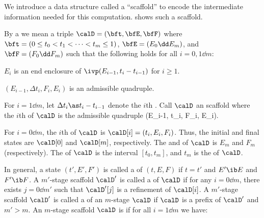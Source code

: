 	We introduce a data structure called a ``scaffold'' to encode the
	intermediate information needed for this computation.
	 shows such a scaffold.


	By a  we mean a triple
		$\calD =(\bft,\bfE,\bfF)$
	where
		$\bft= (0\le t_0 < t_1 < \cdots < t_m\le 1)$,
		$\bfE = (E_0 \dd E_m)$,
		and $\bfF = (F_0 \dd F_m)$ such that
		the following holds for all $i=0,1\dd m$:
	\benum
	\item $E_i$ is an end enclosure of
		$\ivp(E_{i-1},t_i-t_{i-1})$  for $i\ge 1$.
	\item $(E_{i-1}, \Delta t_i, F_i,E_i)$ is an admissible quadruple.
	\eenum
	
	For $i=1\dd m$, let
			$\Delta t_i\as  t_i-t_{i-1}$
	denote the $i$th .  Call $\calD$
	an  scaffold where the $i$th 
	of $\calD$ is the admissible quadruple
				(E_{i-1}, \Delta t_i, F_i, E_i).\eeql

	For $i=0\dd m$, the $i$th  of $\calD$
	is $\calD[i]=(t_i, E_i, F_i)$.
	Thus, the initial and final states are $\calD[0]$ and $\calD[m]$,
	respectively.
	The  and  of $\calD$ is $E_m$ and $F_m$
	(respectively).  The  of $\calD$ is the interval
	$[t_0,t_m]$, and $t_m$ is the  of $\calD$.

%

	In general, a state $(t',E',F')$ is called a  of
	$(t,E,F)$ if $t=t'$ and $E'\ib E$ and $F'\ib F$.
	A $m'$-stage scaffold $\calD'$
	is called a  of $\calD$ if 
	for any $i=0\dd m$, 
	there exists $j=0\dd m'$ such that
	$\calD'[j]$ is a refinement of $\calD[i]$.
	A $m'$-stage scaffold $\calD'$
	is called a  of an $m$-stage $\calD$ if $\calD$ is a
	prefix of $\calD'$ and $m'>m$.
	An $m$-stage scaffold $\calD$
	is  if for all $i=1\dd m$ we have:

